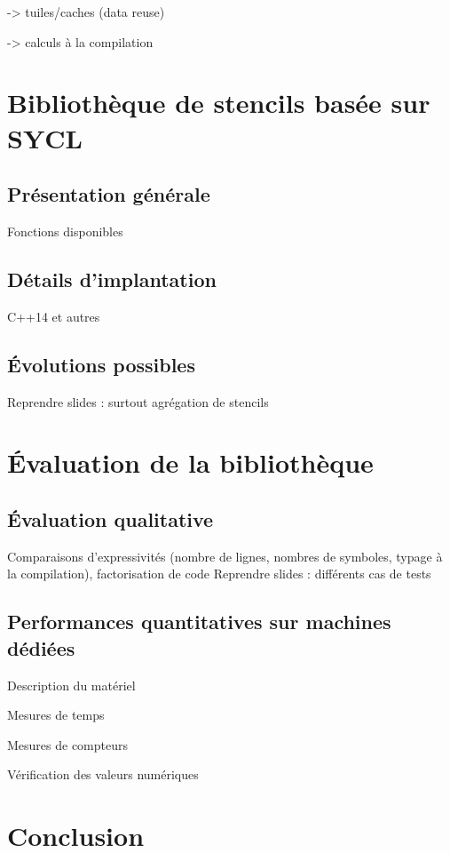 \documentclass[11pt,onecolumn]{report}
\begin{document}
-> tuiles/caches (data reuse)

-> calculs à la compilation

\chapter{Bibliothèque de stencils basée sur SYCL}

\section{Présentation générale}

Fonctions disponibles

\section{Détails d'implantation}

C++14 et autres

\section{\'Evolutions possibles}

Reprendre slides : surtout agrégation de stencils



\chapter{\'Evaluation de la bibliothèque}


\section{\'Evaluation qualitative}

Comparaisons d'expressivités (nombre de lignes, nombres de symboles, typage à la compilation), factorisation de code
Reprendre slides : différents cas de tests


\section{Performances quantitatives sur machines dédiées}

Description du matériel

Mesures de temps

Mesures de compteurs

Vérification des valeurs numériques

\chapter{Conclusion}
\end{document}

